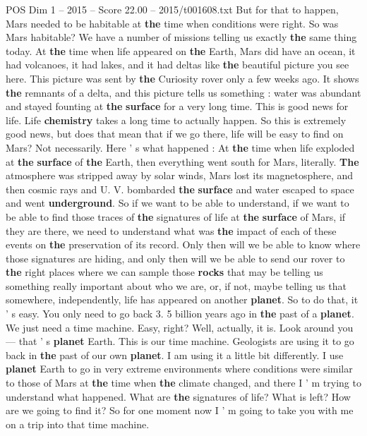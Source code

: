 \begin{textsample}{POS Dim 1 – 2015 – Score 22.00 – 2015/t001608.txt}
But for that to happen, Mars needed to be habitable at \textbf{the} time when conditions were right.
So was Mars habitable?
We have a number of missions telling us exactly \textbf{the} same thing today.
At \textbf{the} time when life appeared on \textbf{the} Earth, Mars did have an ocean, it had volcanoes, it had lakes, and it had deltas like \textbf{the} beautiful picture you see here.
This picture was sent by \textbf{the} Curiosity rover only a few weeks ago.
It shows \textbf{the} remnants of a delta, and this picture tells us something : water was abundant and stayed founting at \textbf{the} \textbf{surface} for a very long time.
This is good news for life.
Life \textbf{chemistry} takes a long time to actually happen.
So this is extremely good news, but does that mean that if we go there, life will be easy to find on Mars?
Not necessarily.
Here ' s what happened : At \textbf{the} time when life exploded at \textbf{the} \textbf{surface} of \textbf{the} Earth, then everything went south for Mars, literally. \textbf{The} atmosphere was stripped away by solar winds, Mars lost its magnetosphere, and then cosmic rays and U.
V. bombarded \textbf{the} \textbf{surface} and water escaped to space and went \textbf{underground}.
So if we want to be able to understand, if we want to be able to find those traces of \textbf{the} signatures of life at \textbf{the} \textbf{surface} of Mars, if they are there, we need to understand what was \textbf{the} impact of each of these events on \textbf{the} preservation of its record.
Only then will we be able to know where those signatures are hiding, and only then will we be able to send our rover to \textbf{the} right places where we can sample those \textbf{rocks} that may be telling us something really important about who we are, or, if not, maybe telling us that somewhere, independently, life has appeared on another \textbf{planet}.
So to do that, it ' s easy.
You only need to go back 3. 5 billion years ago in \textbf{the} past of a \textbf{planet}.
We just need a time machine.
Easy, right?
Well, actually, it is.
Look around you — that ' s \textbf{planet} Earth.
This is our time machine.
Geologists are using it to go back in \textbf{the} past of our own \textbf{planet}.
I am using it a little bit differently.
I use \textbf{planet} Earth to go in very extreme environments where conditions were similar to those of Mars at \textbf{the} time when \textbf{the} climate changed, and there I ' m trying to understand what happened.
What are \textbf{the} signatures of life?
What is left?
How are we going to find it?
So for one moment now I ' m going to take you with me on a trip into that time machine.

\end{textsample}
